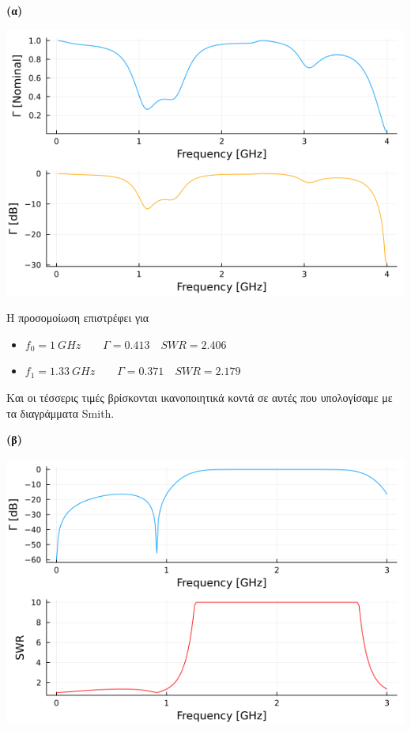 \documentclass[12pt]{article}
\begin{document}
\textbf{(α)}

\begin{center}
    \includegraphics*[scale=0.65]{1-2-a.png}
\end{center}
Η προσομοίωση επιστρέφει για 
\begin{itemize}
    \item \(f_0 = \SI{1}{GHz} \qquad \Gamma = 0.413 \quad SWR = 2.406\)
    \item \(f_1 = \SI{1.33}{GHz} \qquad \Gamma = 0.371 \quad SWR = 2.179\)
\end{itemize}
Και οι τέσσερις τιμές βρίσκονται ικανοποιητικά κοντά σε αυτές που υπολογίσαμε με τα διαγράμματα Smith. 
\bigskip

\textbf{(β)}
\begin{center}
    \includegraphics*[scale=0.65]{1-2-b_0.png}
\end{center}
\end{document}
